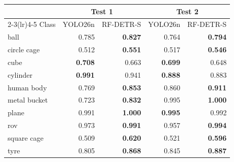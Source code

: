 \begin{tabular}{lrrrr}
\toprule
 & \multicolumn{2}{c}{Test 1} & \multicolumn{2}{c}{Test 2} \\
\cmidrule(lr){2-3}\cmidrule(lr){4-5}
Class & YOLO26n & RF-DETR-S & YOLO26n & RF-DETR-S \\
\midrule
ball & 0.785 & \textbf{0.827} & 0.764 & \textbf{0.794} \\
circle cage & 0.512 & \textbf{0.551} & 0.517 & \textbf{0.546} \\
cube & \textbf{0.708} & 0.663 & \textbf{0.699} & 0.648 \\
cylinder & \textbf{0.991} & 0.941 & \textbf{0.888} & 0.883 \\
human body & 0.769 & \textbf{0.853} & 0.860 & \textbf{0.911} \\
metal bucket & 0.723 & \textbf{0.832} & 0.995 & \textbf{1.000} \\
plane & 0.991 & \textbf{1.000} & \textbf{0.995} & 0.992 \\
rov & 0.973 & \textbf{0.991} & 0.957 & \textbf{0.994} \\
square cage & 0.509 & \textbf{0.620} & 0.521 & \textbf{0.596} \\
tyre & 0.805 & \textbf{0.868} & 0.845 & \textbf{0.887} \\
\bottomrule
\end{tabular}
